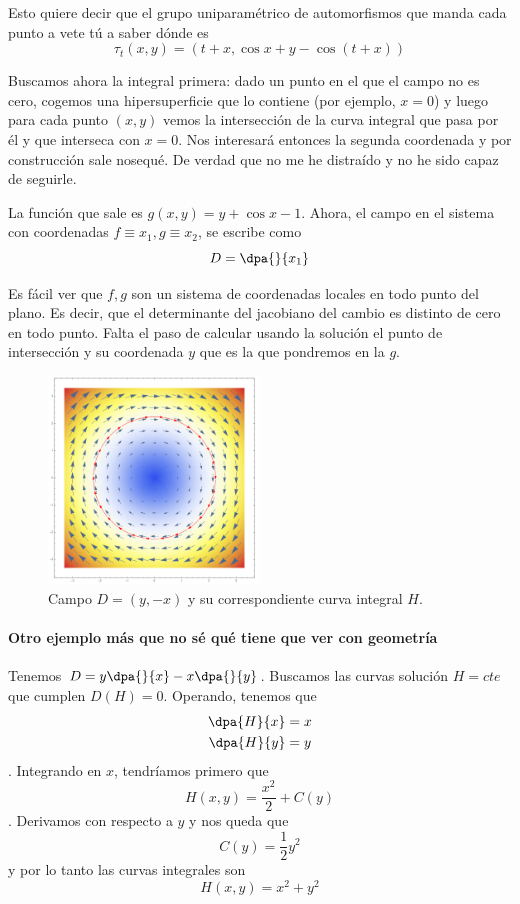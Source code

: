 Esto quiere decir que el grupo uniparamétrico de automorfismos que manda cada punto a vete tú a saber dónde es \[ τ_t(x,y) = \left(t+x, \cos x + y - \cos(t+x)\right)\]

Buscamos ahora la integral primera: dado un punto en el que el campo no es cero, cogemos una hipersuperficie que lo contiene (por ejemplo, $x=0$) y luego para cada punto $(x,y)$ vemos la intersección de la curva integral que pasa por él y que interseca con $x = 0$. Nos interesará entonces la segunda coordenada y por construcción sale nosequé. De verdad que no me he distraído y no he sido capaz de seguirle.

La función que sale es $g(x,y) = y + \cos x - 1$. Ahora, el campo en el sistema con coordenadas $f \equiv x_1,g \equiv x_2$, se escribe como \[ D = \dpa{}{x_1} \]

Es fácil ver que $f,g$ son un sistema de coordenadas locales en todo punto del plano. Es decir, que el determinante del jacobiano del cambio es distinto de cero en todo punto. Falta el paso de calcular usando la solución el punto de intersección y su coordenada $y$ que es la que pondremos en la $g$.

\begin{figure}
\centering
\includegraphics[width=0.5\textwidth]{img/III_CampoCircular.png}
\caption{Campo $D = (y, -x)$ y su correspondiente curva integral $H$.}
\end{figure}

\paragraph{Otro ejemplo más que no sé qué tiene que ver con geometría} Tenemos $D = y \dpa{}{x} - x \dpa{}{y}$. Buscamos las curvas solución $H = cte$ que cumplen $D(H) = 0$. Operando, tenemos que \begin{align*} \dpa{H}{x} &= x \\ \dpa{H}{y} &= y \end{align*}. Integrando en $x$, tendríamos primero que \[ H(x,y) = \frac{x^2}{2} + C(y) \]. Derivamos con respecto a $y$ y nos queda que \[ C(y) = \frac{1}{2}y^2\] y por lo tanto las curvas integrales son \[ H(x,y) = x^2 + y^2\]


